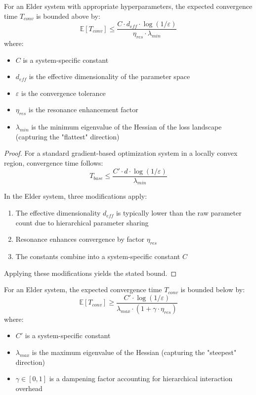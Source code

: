 \begin{theorem}
For an Elder system with appropriate hyperparameters, the expected convergence time $T_{conv}$ is bounded above by:
\begin{equation}
\mathbb{E}[T_{conv}] \leq \frac{C \cdot d_{eff} \cdot \log(1/\varepsilon)}{\eta_{res} \cdot \lambda_{min}}
\end{equation}
where:
\begin{itemize}
    \item $C$ is a system-specific constant
    \item $d_{eff}$ is the effective dimensionality of the parameter space
    \item $\varepsilon$ is the convergence tolerance
    \item $\eta_{res}$ is the resonance enhancement factor
    \item $\lambda_{min}$ is the minimum eigenvalue of the Hessian of the loss landscape (capturing the "flattest" direction)
\end{itemize}
\end{theorem}

\begin{proof}
For a standard gradient-based optimization system in a locally convex region, convergence time follows:
\begin{equation}
T_{base} \leq \frac{C' \cdot d \cdot \log(1/\varepsilon)}{\lambda_{min}}
\end{equation}

In the Elder system, three modifications apply:
\begin{enumerate}
    \item The effective dimensionality $d_{eff}$ is typically lower than the raw parameter count due to hierarchical parameter sharing
    \item Resonance enhances convergence by factor $\eta_{res}$
    \item The constants combine into a system-specific constant $C$
\end{enumerate}

Applying these modifications yields the stated bound.
\end{proof}

\begin{theorem}
For an Elder system, the expected convergence time $T_{conv}$ is bounded below by:
\begin{equation}
\mathbb{E}[T_{conv}] \geq \frac{C' \cdot \log(1/\varepsilon)}{\lambda_{max} \cdot (1 + \gamma \cdot \eta_{res})}
\end{equation}
where:
\begin{itemize}
    \item $C'$ is a system-specific constant
    \item $\lambda_{max}$ is the maximum eigenvalue of the Hessian (capturing the "steepest" direction)
    \item $\gamma \in [0,1]$ is a dampening factor accounting for hierarchical interaction overhead
\end{itemize}
\end{theorem}


